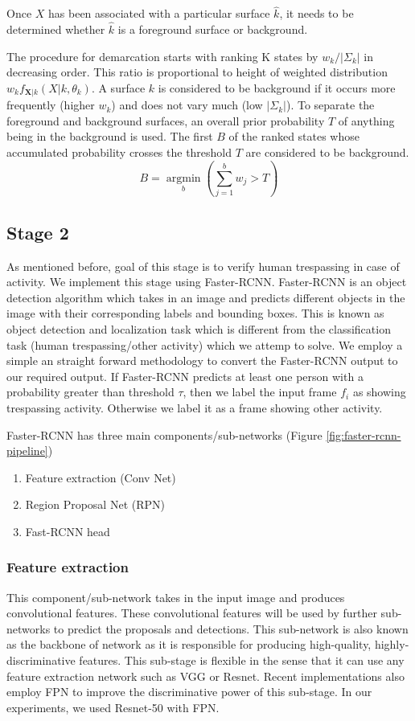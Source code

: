 Once $X$ has been associated with a particular surface $\hat{k}$, it needs to be determined whether $\hat{k}$ is a foreground surface or background. 

The procedure for demarcation starts with ranking K states by $w_k / | \Sigma_k |$ in decreasing order. This ratio is proportional to height of weighted distribution $w_k f_{\mathbf{X}|k}(X|k,\theta_k)$. A surface $k$ is considered to be 
background if it occurs more frequently (higher $w_k$) and does not vary much (low $|\Sigma_k|$).  To separate the foreground and background surfaces, an overall prior probability $T$ of anything being in the background is used. The first $B$ of the ranked  states whose accumulated probability crosses the threshold $T$ are considered to be background. 
$$ B=\operatorname*{argmin}_b (\sum_{j=1}^b w_{j} > T)$$ 

\subsection{Stage 2 }
As mentioned before, goal of this stage is to verify human trespassing in case of activity. We implement this stage using Faster-RCNN\cite{ref_fasterrcnn}. Faster-RCNN is an object detection algorithm which takes in an image and predicts different objects in the image with their corresponding labels and bounding boxes. This is known as object detection and localization task which is different from the classification task (human trespassing/other activity) which we attemp to solve. We employ a simple an straight forward methodology to convert the Faster-RCNN output to our required output. If Faster-RCNN predicts at least one person with a probability greater than threshold $\tau$, then we label the input frame $f_i$ as showing trespassing activity. Otherwise we label it as a frame showing other activity. 

Faster-RCNN has three main components/sub-networks (Figure \ref{fig:faster-rcnn-pipeline})
\begin{enumerate}
    \item Feature extraction (Conv Net)
    \item Region Proposal Net (RPN)
    \item Fast-RCNN head
\end{enumerate}

\subsubsection{Feature extraction}
This component/sub-network takes in the input image and produces convolutional features. These convolutional features will be used by further sub-networks to predict the proposals and detections. This sub-network is also known as the backbone of network as it is responsible for producing high-quality, highly-discriminative features. This sub-stage is flexible in the sense that it can use any feature extraction network such as VGG or Resnet. Recent implementations also employ FPN\cite{lin2017feature} to improve the discriminative power of this sub-stage. In our experiments, we used Resnet-50 with FPN. 

